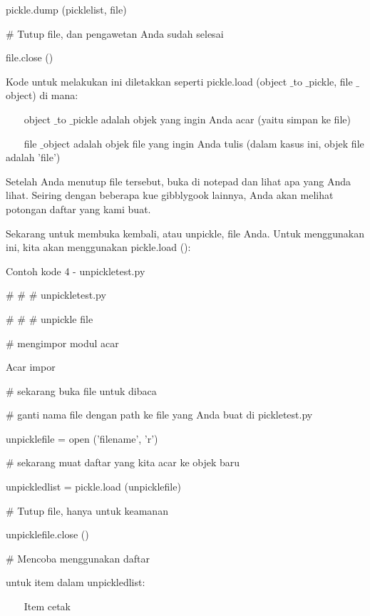 pickle.dump (picklelist, file) \par
\vspace{12pt}
 $  \#  $ Tutup file, dan pengawetan Anda sudah selesai \par
file.close () \par
\vspace{12pt}
Kode untuk melakukan ini diletakkan seperti pickle.load (object $  \_  $to $  \_  $pickle, file $  \_  $object) di mana: \par
\vspace{12pt}
~~~ object $  \_  $to $  \_  $pickle adalah objek yang ingin Anda acar (yaitu simpan ke file) \par
~~~ file $  \_  $object adalah objek file yang ingin Anda tulis (dalam kasus ini, objek file adalah 'file') \par
\vspace{12pt}
Setelah Anda menutup file tersebut, buka di notepad dan lihat apa yang Anda lihat. Seiring dengan beberapa kue gibblygook lainnya, Anda akan melihat potongan daftar yang kami buat. \par
\vspace{12pt}
Sekarang untuk membuka kembali, atau unpickle, file Anda. Untuk menggunakan ini, kita akan menggunakan pickle.load (): \par
Contoh kode 4 - unpickletest.py \par
\vspace{12pt}
 $  \#  $ $  \#  $ $  \#  $ unpickletest.py \par
 $  \#  $ $  \#  $ $  \#  $ unpickle file \par
\vspace{12pt}
 $  \#  $ mengimpor modul acar \par
Acar impor \par
\vspace{12pt}
 $  \#  $ sekarang buka file untuk dibaca \par
 $  \#  $ ganti nama file dengan path ke file yang Anda buat di pickletest.py \par
unpicklefile = open ('filename', 'r') \par
\vspace{12pt}
 $  \#  $ sekarang muat daftar yang kita acar ke objek baru \par
unpickledlist = pickle.load (unpicklefile) \par
\vspace{12pt}
 $  \#  $ Tutup file, hanya untuk keamanan \par
unpicklefile.close () \par
\vspace{12pt}
 $  \#  $ Mencoba menggunakan daftar \par
untuk item dalam unpickledlist: \par
~~~ Item cetak \par
\vspace{12pt}

